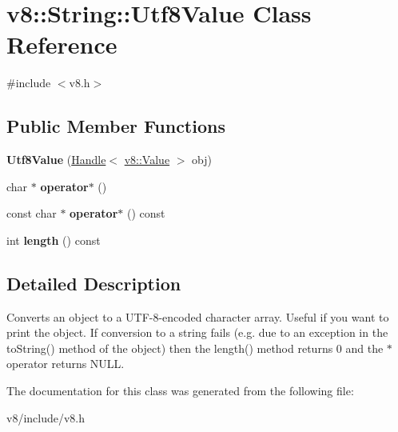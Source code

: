 \hypertarget{classv8_1_1String_1_1Utf8Value}{}\section{v8\+:\+:String\+:\+:Utf8\+Value Class Reference}
\label{classv8_1_1String_1_1Utf8Value}


{\ttfamily \#include $<$v8.\+h$>$}

\subsection*{Public Member Functions}
\begin{DoxyCompactItemize}
\item 
\hypertarget{classv8_1_1String_1_1Utf8Value_aded9fd7ed406e79d5bc40eca15b6b3d7}{}{\bfseries Utf8\+Value} (\hyperlink{classv8_1_1Handle}{Handle}$<$ \hyperlink{classv8_1_1Value}{v8\+::\+Value} $>$ obj)\label{classv8_1_1String_1_1Utf8Value_aded9fd7ed406e79d5bc40eca15b6b3d7}

\item 
\hypertarget{classv8_1_1String_1_1Utf8Value_a6cb4914bc426bbe60b0dfdff32213e59}{}char $\ast$ {\bfseries operator$\ast$} ()\label{classv8_1_1String_1_1Utf8Value_a6cb4914bc426bbe60b0dfdff32213e59}

\item 
\hypertarget{classv8_1_1String_1_1Utf8Value_a6557ad0916c472faebd8bfdc3da5c4f7}{}const char $\ast$ {\bfseries operator$\ast$} () const \label{classv8_1_1String_1_1Utf8Value_a6557ad0916c472faebd8bfdc3da5c4f7}

\item 
\hypertarget{classv8_1_1String_1_1Utf8Value_a1e2572abf6adc0786769482df9906f19}{}int {\bfseries length} () const \label{classv8_1_1String_1_1Utf8Value_a1e2572abf6adc0786769482df9906f19}

\end{DoxyCompactItemize}


\subsection{Detailed Description}
Converts an object to a U\+T\+F-\/8-\/encoded character array. Useful if you want to print the object. If conversion to a string fails (e.\+g. due to an exception in the to\+String() method of the object) then the length() method returns 0 and the $\ast$ operator returns N\+U\+L\+L. 

The documentation for this class was generated from the following file\+:\begin{DoxyCompactItemize}
\item 
v8/include/v8.\+h\end{DoxyCompactItemize}
